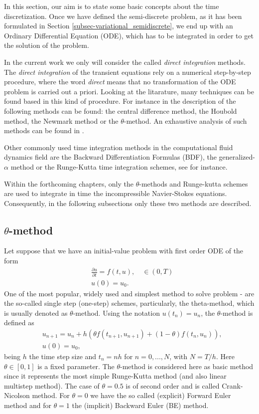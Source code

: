 In this section, our aim is to state some basic concepts about the time discretization. Once we have defined the semi-discrete problem, as it has been formulated in Section \ref{subsec-variational_semidiscrete}, we end up with an Ordinary Differential Equation (ODE), which has to be integrated in order to get the solution of the problem.

In the current work we only will consider the called \textit{direct integration} methods. The \textit{direct integration} of the transient equations rely on a numerical step-by-step procedure, where the word \textit{direct} means that no transformation of the ODE problem is carried out a priori. Looking at the litarature, many techniques can be found based in this kind of procedure. For instance in \cite{Per Klaus-Jürgen Bathe} the description of the following methods can be found: the central difference method, the Houbold method, the Newmark method or the $ \theta $-method. An exhaustive analysis of such methods can be found in \cite{belytscho_hughes}.

Other commonly used time integration methods in the computational fluid dynamics field are the Backward Differentiation Formulas (BDF), the generalized-$ \alpha $ method or the Runge-Kutta time integration schemes, see \cite{brayton_gustavson_1972, jansen_2000, dettmer_peric_2003,hairer} for instance.

Within the forthcoming chapters, only the $ \theta $-methods and Runge-kutta schemes are used to integrate in time the incompressible Navier-Stokes equations. Consequently, in the following subsections only these two methods are described. 

\subsection{$ \theta $-method}
Let suppose that we have an initial-value problem with first order ODE of the form
\begin{align}
\label{eq-C2_time_ODE}
&\frac{\partial u}{\partial t}=f(t,u),\quad\in(0,T)\\
\label{eq-C2_time_ODE_0}
&u(0)=u_0.
\end{align}
One of the most popular, widely used and simplest method to solve problem - are the so-called single step (one-step) schemes, particularly, the theta-method, which is usually denoted as $ \theta $-method. Using the notation $u(t_n) = u_n$, the $ \theta $-method is defined as
\begin{align*}
\label{eq-C2_time_theta_method}
&u_{n+1} = u_n + h (\theta f(t_{n+1}, u_{n+1}) + (1-\theta )f(t_n,u_n)),\\
&u(0) = u_0,
\end{align*}
being $ h $ the time step size and $ t_n = nh $ for $ n=0,...,N $, with $ N=T/h $. Here $ \theta \in [0, 1] $ is a fixed parameter. The $ \theta $-method is considered here as basic method since it represents the most simple Runge-Kutta method (and also linear multistep method). The case of $ \theta=0.5 $ is of second order and is called Crank-Nicolson method. For $ \theta=0 $ we have the so called (explicit) Forward Euler method and for $ \theta=1 $ the (implicit) Backward Euler (BE) method.

